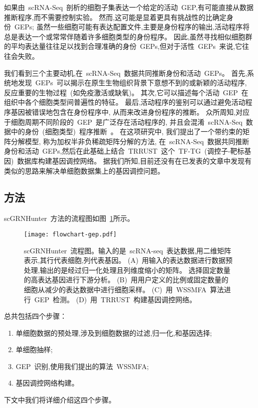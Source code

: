 如果由~scRNA-Seq~剖析的细胞子集表达一个给定的活动~GEP,有可能直接从数据推断程序,而不需要控制实验。
然而,这可能是显着更具有挑战性的比确定身份~GEPs;
虽然一些细胞可能有表达配置文件,主要是身份程序的输出,活动程序将总是表达一个或常常伴随着许多细胞类型的身份程序。
因此,虽然寻找相似细胞群的平均表达量往往足以找到合理准确的身份~GEPs,但对于活性~GEPs~来说,它往往会失败。

我们看到三个主要动机,在~scRNA-Seq~数据共同推断身份和活动~GEPs。
首先,系统地发现~GEPs~可以揭示在原生生物组织背景下意想不到的或新颖的活动程序,
反应重要的生物过程~(如免疫激活或缺氧)。
其次,它可以描述每个活动~GEP~在组织中各个细胞类型间普遍性的特征。
最后,活动程序的鉴别可以通过避免活动程序基因被错误地包含在身份程序中, 从而来改进身份程序的推断。
众所周知,对应于细胞周期不同阶段的~GEP~是广泛存在活动程序的,
并且会混淆~scRNA-Seq~数据中的身份~(细胞类型)~程序推断~\cite{scialdone2015computational,chen2017controlling}。
在这项研究中, 我们提出了一个带约束的矩阵分解模型, 称为加权半非负稀疏矩阵分解的方法,
在~scRNA-Seq~数据共同推断身份和活动~GEPs,然后在此基础上结合~TRRUST~这个~TF-TG~(调控子-靶标基因)~数据库构建基因调控网络。
据我们所知,目前还没有在已发表的文章中发现有类似的思路来解决单细胞数据集上的基因调控问题。

\subsection{方法}
scGRNHunter~方法的流程图如图~\ref{fig:gep-flowchart}所示。
\begin{figure}[!htbp]
    \centering
    \texttt{[image: flowchart-gep.pdf]}
    \caption{
        scGRNHunter~流程图。输入的是~scRNA-seq~表达数据,用二维矩阵表示,其行代表细胞,列代表基因。
        (A)~用输入的表达数据进行数据预处理,输出的是经过归一化处理且列维度缩小的矩阵。
        选择固定数量的高表达基因进行下游分析。
        (B)~用用户定义的比例或固定数量的细胞从减少的表达数据中进行细胞采样。
        (C)~用~WSSMFA~算法进行~GEP~检测。
        (D)~用~TRRUST~构建基因调控网络。
    }
    \label{fig:gep-flowchart}
\end{figure}
总共包括四个步骤：
\begin{enumerate}
    \item 单细胞数据的预处理,涉及到细胞数据的过滤,归一化,和基因选择;
    \item 单细胞抽样;
    \item GEP~识别,使用我们提出的算法~WSSMFA;
    \item 基因调控网络构建。
\end{enumerate}
下文中我们将详细介绍这四个步骤。

